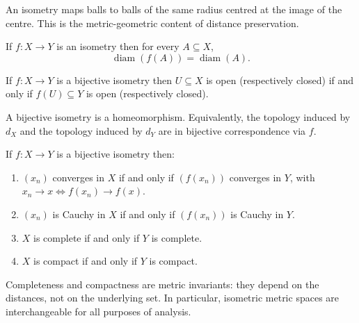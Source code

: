 \begin{remark*}[Intuition]
An isometry maps balls to balls of the same radius centred at the image
of the centre.
This is the metric-geometric content of distance preservation.
\end{remark*}

\begin{proposition}
\label{prop:isometry-preserves-diameter}
If $f : X \to Y$ is an isometry then for every $A \subseteq X$,
\[
\operatorname{diam}(f(A)) = \operatorname{diam}(A).
\]
\end{proposition}

\begin{proposition}
\label{prop:isometry-preserves-open}
If $f : X \to Y$ is a bijective isometry then $U \subseteq X$ is open
(respectively closed) if and only if $f(U) \subseteq Y$ is open
(respectively closed).
\end{proposition}

\begin{remark*}[Consequence]
A bijective isometry is a homeomorphism.
Equivalently, the topology induced by $d_X$ and the topology induced
by $d_Y$ are in bijective correspondence via $f$.
\end{remark*}

\begin{proposition}
\label{prop:isometry-preserves-convergence}
If $f : X \to Y$ is a bijective isometry then:
\begin{enumerate}[label=(\roman*)]
  \item $(x_n)$ converges in $X$ if and only if $(f(x_n))$ converges in $Y$,
        with $x_n \to x \iff f(x_n) \to f(x)$.
  \item $(x_n)$ is Cauchy in $X$ if and only if $(f(x_n))$ is Cauchy in $Y$.
  \item $X$ is complete if and only if $Y$ is complete.
  \item $X$ is compact if and only if $Y$ is compact.
\end{enumerate}
\end{proposition}

\begin{remark*}[Consequence]
Completeness and compactness are metric invariants: they depend on the
distances, not on the underlying set.
In particular, isometric metric spaces are interchangeable for all
purposes of analysis.
\end{remark*}


